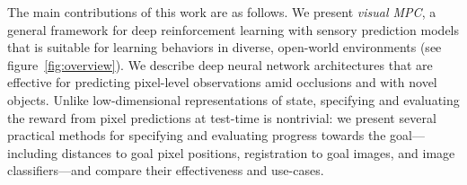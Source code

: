 The main contributions of this work are as follows. We present \emph{visual MPC}, a general framework for deep reinforcement learning with sensory prediction models that is suitable for learning behaviors in diverse, open-world environments (see figure~\ref{fig:overview}).
We describe deep neural network architectures that are effective for predicting pixel-level observations amid occlusions and with novel objects. Unlike low-dimensional representations of state, specifying and evaluating the reward from pixel predictions at test-time is nontrivial: we present several practical methods for specifying and evaluating progress towards the goal---including distances to goal pixel positions, registration to goal images, and image classifiers---and compare their effectiveness and use-cases.
